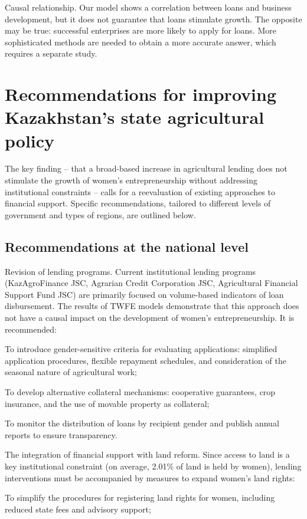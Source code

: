 ﻿\documentclass[sn-mathphys-num]{sn-jnl}
\begin{document}
Causal relationship. Our model shows a correlation between loans and
business development, but it does not guarantee that loans stimulate
growth. The opposite may be true: successful enterprises are more likely
to apply for loans. More sophisticated methods are needed to obtain a
more accurate answer, which requires a separate study.

\section{Recommendations for improving Kazakhstan's state agricultural policy}

The key finding -- that a broad-based increase in agricultural lending
does not stimulate the growth of women's entrepreneurship without
addressing institutional constraints -- calls for a reevaluation of
existing approaches to financial support. Specific recommendations,
tailored to different levels of government and types of regions, are
outlined below.

\subsection{Recommendations at the national level}

Revision of lending programs. Current institutional lending programs
(KazAgroFinance JSC, Agrarian Credit Corporation JSC, Agricultural
Financial Support Fund JSC) are primarily focused on volume-based
indicators of loan disbursement. The results of TWFE models demonstrate
that this approach does not have a causal impact on the development of
women's entrepreneurship. It is recommended:

To introduce gender-sensitive criteria for evaluating applications:
simplified application procedures, flexible repayment schedules, and
consideration of the seasonal nature of agricultural work;

To develop alternative collateral mechanisms: cooperative guarantees,
crop insurance, and the use of movable property as collateral;

To monitor the distribution of loans by recipient gender and publish
annual reports to ensure transparency.

The integration of financial support with land reform. Since access to
land is a key institutional constraint (on average, 2.01\% of land is
held by women), lending interventions must be accompanied by measures to
expand women's land rights:

To simplify the procedures for registering land rights for women,
including reduced state fees and advisory support;
\end{document}
